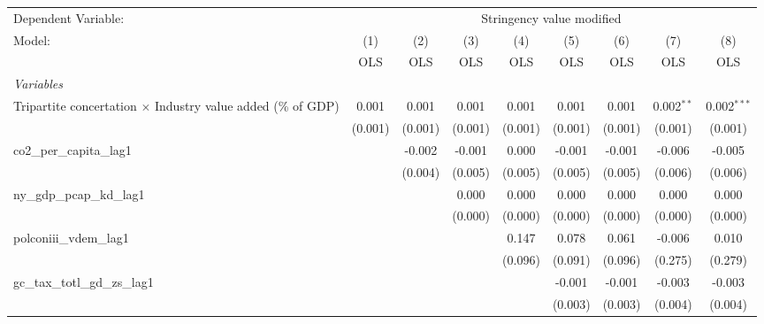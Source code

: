 
\begingroup
\centering
\begin{tabular}{lcccccccc}
   \toprule
   Dependent Variable: & \multicolumn{8}{c}{Stringency value modified}\\
   Model:                                                              & (1)     & (2)     & (3)     & (4)     & (5)     & (6)     & (7)          & (8)\\  
                                                                       &  OLS    & OLS     & OLS     & OLS     & OLS     & OLS     & OLS          & OLS\\  
   \midrule
   \emph{Variables}\\
   Tripartite concertation $\times$ Industry value added (\% of GDP)   & 0.001   & 0.001   & 0.001   & 0.001   & 0.001   & 0.001   & 0.002$^{**}$ & 0.002$^{***}$\\   
                                                                       & (0.001) & (0.001) & (0.001) & (0.001) & (0.001) & (0.001) & (0.001)      & (0.001)\\   
   co2\_per\_capita\_lag1                                              &         & -0.002  & -0.001  & 0.000   & -0.001  & -0.001  & -0.006       & -0.005\\   
                                                                       &         & (0.004) & (0.005) & (0.005) & (0.005) & (0.005) & (0.006)      & (0.006)\\   
   ny\_gdp\_pcap\_kd\_lag1                                             &         &         & 0.000   & 0.000   & 0.000   & 0.000   & 0.000        & 0.000\\   
                                                                       &         &         & (0.000) & (0.000) & (0.000) & (0.000) & (0.000)      & (0.000)\\   
   polconiii\_vdem\_lag1                                               &         &         &         & 0.147   & 0.078   & 0.061   & -0.006       & 0.010\\   
                                                                       &         &         &         & (0.096) & (0.091) & (0.096) & (0.275)      & (0.279)\\   
   gc\_tax\_totl\_gd\_zs\_lag1                                         &         &         &         &         & -0.001  & -0.001  & -0.003       & -0.003\\   
                                                                       &         &         &         &         & (0.003) & (0.003) & (0.004)      & (0.004)\\   

\end{tabular}
